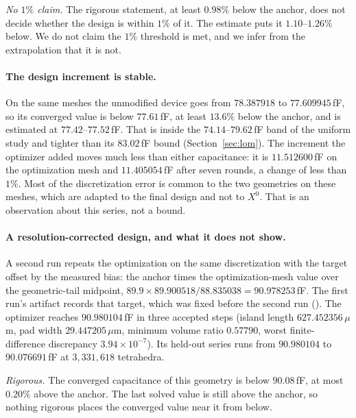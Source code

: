 \documentclass{anvil-paper}
\begin{document}
\emph{No $1\%$ claim.} The rigorous statement, at least $0.98\%$ below
the anchor, does not decide whether the design is within $1\%$ of it.
The estimate puts it $1.10$--$1.26\%$ below. We do not claim the $1\%$
threshold is met, and we infer from the extrapolation that it is not.

\paragraph{The design increment is stable.}
On the same meshes the unmodified device goes from $78.387918$ to
$77.609945$\,fF, so its converged value is below $77.61$\,fF, at least
$13.6\%$ below the anchor, and is estimated at $77.42$--$77.52$\,fF.
That is inside the $74.14$--$79.62$\,fF band of the uniform study and
tighter than its $83.02$\,fF bound (Section~\ref{sec:lom}). The
increment the optimizer added moves much less than either capacitance:
it is $11.512600$\,fF on the optimization mesh and $11.405054$\,fF
after seven rounds, a change of less than $1\%$. Most of the
discretization error is common to the two geometries on these meshes,
which are adapted to the final design and not to $X^0$. That is an
observation about this series, not a bound.

\paragraph{A resolution-corrected design, and what it does not show.}
A second run repeats the optimization on the same discretization with
the target offset by the measured bias: the anchor times the
optimization-mesh value over the geometric-tail midpoint,
$89.9 \times 89.900518 / 88.835038 = 90.978253$\,fF. The first run's
artifact records that target, which was fixed before the second run
().
The optimizer reaches $90.980104$\,fF in three accepted steps (island
length $627.452356\,\mu$m, pad width $29.447205\,\mu$m, minimum volume
ratio $0.57790$, worst finite-difference discrepancy
$3.94\times10^{-7}$). Its held-out series runs from $90.980104$ to
$90.076691$\,fF at $3{,}331{,}618$ tetrahedra.

\emph{Rigorous.} The converged capacitance of this geometry is below
$90.08$\,fF, at most $0.20\%$ above the anchor. The last solved value is
still above the anchor, so nothing rigorous places the converged value
near it from below.
\end{document}
